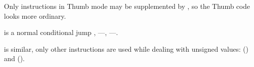 
Only  instructions in Thumb mode may be supplemented by , so the Thumb code 
looks more ordinary.

 is a normal conditional jump , 
---, 
---.

 is similar, only other instructions are used while dealing 
with unsigned values:  
() and  ().
